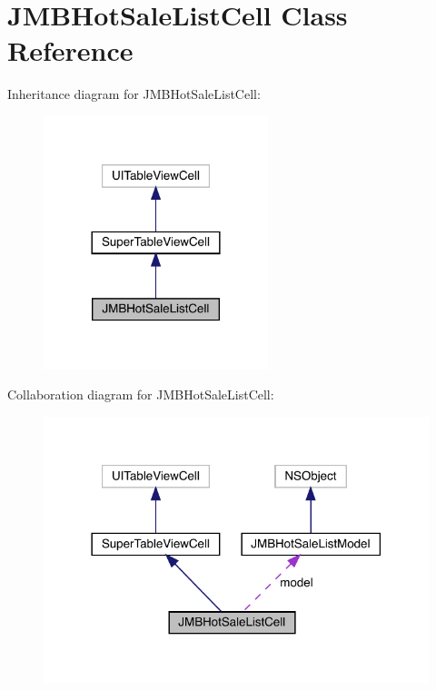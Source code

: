 \hypertarget{interface_j_m_b_hot_sale_list_cell}{}\section{J\+M\+B\+Hot\+Sale\+List\+Cell Class Reference}
\label{interface_j_m_b_hot_sale_list_cell}


Inheritance diagram for J\+M\+B\+Hot\+Sale\+List\+Cell\+:\nopagebreak
\begin{figure}[H]
\begin{center}
\leavevmode
\includegraphics[width=185pt]{interface_j_m_b_hot_sale_list_cell__inherit__graph}
\end{center}
\end{figure}


Collaboration diagram for J\+M\+B\+Hot\+Sale\+List\+Cell\+:\nopagebreak
\begin{figure}[H]
\begin{center}
\leavevmode
\includegraphics[width=318pt]{interface_j_m_b_hot_sale_list_cell__coll__graph}
\end{center}
\end{figure}
